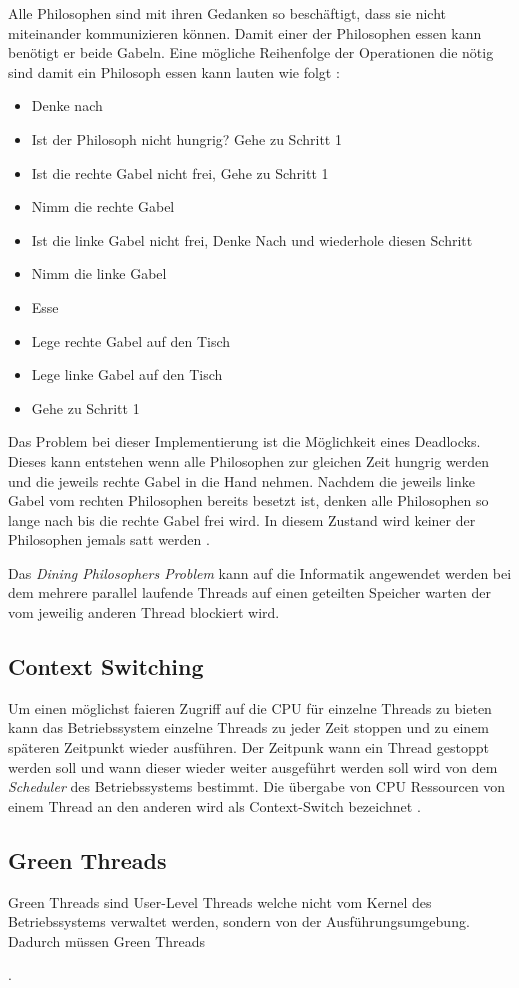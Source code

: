 Alle Philosophen sind mit ihren Gedanken so beschäftigt, dass sie nicht miteinander kommunizieren können. Damit einer der Philosophen essen kann benötigt er beide Gabeln. Eine mögliche Reihenfolge der Operationen die nötig sind damit ein Philosoph essen kann lauten wie folgt \cite[p. 21]{dij71}:

\begin{itemize}
  \item Denke nach
  \item Ist der Philosoph nicht hungrig? Gehe zu Schritt 1
  \item Ist die rechte Gabel nicht frei, Gehe zu Schritt 1
  \item Nimm die rechte Gabel
  \item Ist die linke Gabel nicht frei, Denke Nach und wiederhole diesen Schritt
  \item Nimm die linke Gabel
  \item Esse
  \item Lege rechte Gabel auf den Tisch  
  \item Lege linke Gabel auf den Tisch
  \item Gehe zu Schritt 1
\end{itemize}

Das Problem bei dieser Implementierung ist die Möglichkeit eines Deadlocks. Dieses kann entstehen wenn alle Philosophen zur gleichen Zeit hungrig werden und die jeweils rechte Gabel in die Hand nehmen. Nachdem die jeweils linke Gabel vom rechten Philosophen bereits besetzt ist, denken alle Philosophen so lange nach bis die rechte Gabel frei wird. In diesem Zustand wird keiner der Philosophen jemals satt werden \cite[p. 21]{dij71}. 

Das \emph{Dining Philosophers Problem} kann auf die Informatik angewendet werden bei dem mehrere parallel laufende Threads auf einen geteilten Speicher warten der vom jeweilig anderen Thread blockiert wird. 

\subsection{Context Switching}
Um einen möglichst faieren Zugriff auf die CPU für einzelne Threads zu bieten kann das Betriebssystem einzelne Threads zu jeder Zeit stoppen und zu einem späteren Zeitpunkt wieder ausführen. Der Zeitpunk wann ein Thread gestoppt werden soll und wann dieser wieder weiter ausgeführt werden soll wird von dem \emph{Scheduler} des Betriebssystems bestimmt. Die übergabe von CPU Ressourcen von einem Thread an den anderen wird als Context-Switch bezeichnet \cite[p. 23]{Sto2013}. 







\subsection{Green Threads}
Green Threads sind User-Level Threads welche nicht vom Kernel des Betriebssystems verwaltet werden, sondern von der Ausführungsumgebung. Dadurch müssen Green Threads 


 \cite[p.2]{Sun01}.